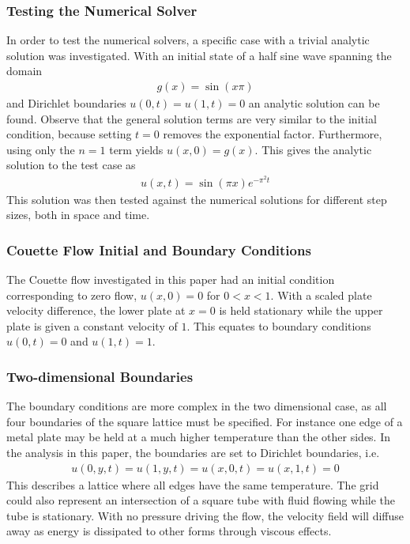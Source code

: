 \documentclass[aps,reprint]{revtex4-1}
\begin{document}
\subsubsection{Testing the Numerical Solver}
In order to test the numerical solvers, a specific case with a trivial analytic solution
was investigated. With an initial state of a half sine wave spanning the domain
\begin{align*}
  g(x) = \sin{(x \pi)}
\end{align*}
and Dirichlet boundaries $u(0,t) = u(1,t) = 0$ an analytic solution can be found.
Observe that the general solution terms are very similar to the initial condition,
because setting $t = 0$ removes the exponential factor. Furthermore, using only
the $n = 1$ term yields $u(x,0) = g(x)$. This gives the analytic solution to the test case as
\begin{align*}
  u(x,t) = \sin{(\pi x)} e^{- \pi^2 t}
\end{align*}
This solution was then tested against the numerical solutions for different step
sizes, both in space and time.
\subsubsection{Couette Flow Initial and Boundary Conditions}
The Couette flow investigated in this paper had an initial condition
corresponding to zero flow, $u(x,0) = 0$ for $0 < x < 1$. With a scaled plate velocity difference, the
lower plate at $x = 0$ is held stationary while the upper plate is given a constant
velocity of $1$. This equates to boundary conditions $u(0,t) = 0$ and $u(1,t) = 1$.
\subsubsection{Two-dimensional Boundaries}
The boundary conditions are more complex in the two dimensional case, as all
four boundaries of the square lattice must be specified.
For instance one edge of a metal plate may be held at a much
higher temperature than the other sides. In the analysis in this paper, the boundaries
are set to Dirichlet boundaries, i.e.
\begin{align*}
  u(0,y,t) = u(1,y,t) = u(x,0,t) = u(x,1,t) = 0
\end{align*}
This describes a lattice where all edges have the same temperature. The grid could also represent an
intersection of a square tube with fluid flowing while the tube is stationary. With no
pressure driving the flow, the velocity field will diffuse away as energy is dissipated
to other forms through viscous effects.
\end{document}
